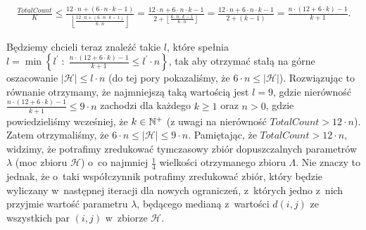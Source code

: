 \begin{gather*}
	\frac{TotalCount}{K} \leqslant \frac{12 \cdot n + \left( 6 \cdot n \cdot k - 1 \right)}{\left\lfloor \frac{12 \cdot n + \left( 6 \cdot n \cdot k - 1 \right)}{6 \cdot n} \right\rfloor} = \frac{12 \cdot n + 6 \cdot n \cdot k - 1}{2 + \left\lfloor \frac{6 \cdot n \cdot k - 1}{6 \cdot n} \right\rfloor} = \frac{12 \cdot n + 6 \cdot n \cdot k - 1}{2 + \left( k - 1\right)} = \frac{n \cdot \left( 12 + 6 \cdot k \right) - 1}{k + 1}\text{.}
\end{gather*}

Będziemy chcieli teraz znaleźć takie $l$, które spełnia $l = \min \left\{ l^{\prime} \; : \; \frac{n \cdot \left( 12 + 6 \cdot k \right) - 1}{k + 1} \leqslant l^{\prime} \cdot n \right\}$, tak aby otrzymać stałą na górne oszacowanie $\left| \mathcal{H} \right| \leqslant l \cdot n$ (do tej pory pokazaliśmy, że $6 \cdot n \leqslant \left| \mathcal{H} \right|$). Rozwiązując to równanie otrzymamy, że najmniejszą taką wartością jest $l = 9$, gdzie nierówność $\frac{n \cdot \left( 12 + 6 \cdot k \right) - 1}{k + 1} \leqslant 9 \cdot n$ zachodzi dla każdego $k \geqslant 1$ oraz $n > 0$, gdzie powiedzieliśmy wcześniej, że $k \in \mathbb{N}^{+}$ (z uwagi na nierówność $TotalCount > 12 \cdot n$). Zatem otrzymaliśmy, że $6 \cdot n \leqslant \left| \mathcal{H} \right| \leqslant 9 \cdot n$. Pamiętając, że $TotalCount > 12 \cdot n$, widzimy, że potrafimy zredukować tymczasowy zbiór dopuszczalnych parametrów $\lambda$ (moc zbioru $\mathcal{H}$) o~co najmniej $\frac{1}{4}$ wielkości otrzymanego zbioru $\Lambda$. Nie znaczy to jednak, że o~taki współczynnik potrafimy zredukować zbiór, który będzie wyliczany w~następnej iteracji dla nowych ograniczeń, z~których jedno z~nich przyjmie wartość parametru $\lambda$, będącego medianą z~wartości $d \left( i, j \right)$ ze wszystkich par $\left( i, j \right)$ w~zbiorze $\mathcal{H}$.

